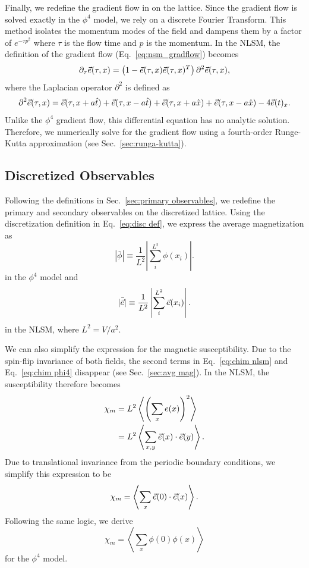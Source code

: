 Finally, we redefine the gradient flow in on the lattice. Since the gradient flow is solved exactly in the $\phi^4$ model, we rely on a discrete Fourier Transform. This method isolates the momentum modes of the field and dampens them by a factor of $e^{-\tau p^2}$ where $\tau$ is the flow time and $p$ is the momentum. In the NLSM, the definition of the gradient flow (Eq.~\ref{eq:nsm_gradflow}) becomes 
\begin{equation}
    \label{eq:nsm_gradflow_disc}
    \partial_\tau \vec e (\tau, x) = \left( 1 - \vec e(\tau,x) \vec e(\tau,x)^T\right) \partial^2 \vec e(\tau,x),
\end{equation}
 where the Laplacian operator $\partial^2$ is defined as
\begin{equation*}
    \partial^2 \vec e(\tau,x) = \vec e(\tau, x+a \hat{t}) + \vec e(\tau,x-a\hat t) + \vec e(\tau, x+a \hat{x}) + \vec e(\tau,x-a\hat x) - 4 \vec e(t)_x.
\end{equation*}
Unlike the $\phi^4$ gradient flow, this differential equation has no analytic solution. Therefore, we numerically solve for the gradient flow using a fourth-order Runge-Kutta approximation (see Sec.~\ref{sec:runga-kutta}).

\subsection{Discretized Observables}
Following the definitions in Sec.~\ref{sec:primary observables}, we redefine the primary and secondary observables on the discretized lattice. Using the discretization definition in Eq.~\ref{eq:disc def}, we express the average magnetization as 
\begin{equation}
|\bar\phi| \equiv \frac{1}{L^2}\left| \sum_i^{L^2} \phi(x_i)\right|.
\end{equation}
in the $\phi^4$ model and 
\begin{equation}
    |\bar{\vec e}| \equiv \frac{1}{L^2}\left|\sum_i^{L^2} \vec e(x_i)\right|.
\end{equation}
in the NLSM, where $L^2 = V/a^2$.

We can also simplify the expression for the magnetic susceptibility. Due to the spin-flip invariance of both fields, the second terms in Eq.~\ref{eq:chim nlsm} and Eq.~\ref{eq:chim phi4} disappear (see Sec.~\ref{sec:avg mag}). In the NLSM, the susceptibility therefore becomes
\begin{align}
    \chi_m &= L^2 \left\langle \left( \sum_x e(x) \right)^2\right\rangle  \\
           &= L^2 \left\langle \sum_{x,y}\vec e(x)\cdot \vec e(y) \right\rangle. 
\end{align}
Due to translational invariance from the periodic boundary conditions, we simplify this expression to be
\begin{equation}
    \chi_m = \left\langle \sum_x \vec e(0)\cdot\vec e(x) \right\rangle.
\end{equation}
Following the same logic, we derive 
\begin{equation}
    \chi_m = \left\langle \sum_x \phi(0)\phi(x) \right\rangle
\end{equation}
for the $\phi^4$ model. 

